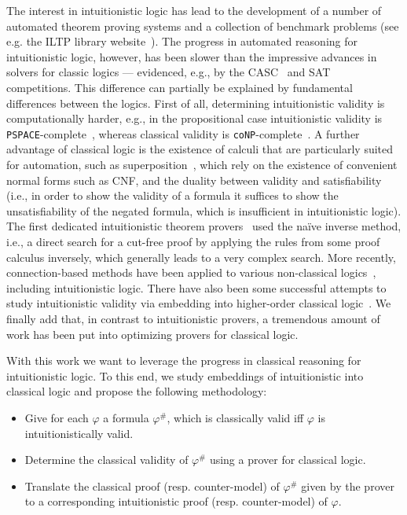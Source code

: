 \documentclass{easychair}
\theoremstyle{definition}
\theoremstyle{definition}
\theoremstyle{definition}
\theoremstyle{definition}
\theoremstyle{definition}
\theoremstyle{definition}
\theoremstyle{definition}
\begin{document}
The interest in intuitionistic logic has lead to the development of a number of automated theorem proving systems and a collection of benchmark problems (see e.g. the ILTP library website~\cite{iltp}).
The progress in automated reasoning for intuitionistic logic, however, has been slower than the  impressive advances in solvers for classic logics --- evidenced, e.g., by the CASC~\cite{casc} and SAT~\cite{satc} competitions.
This difference can partially be explained by fundamental differences between the logics.
First of all, determining intuitionistic validity is computationally harder, e.g., in the propositional case intuitionistic validity is \verb+PSPACE+-complete~\cite{statman1979intuitionistic}, whereas classical validity is \verb+coNP+-complete~\cite{cook1971complexity}.
A further advantage of classical logic is the existence of calculi that are particularly suited for automation, such as superposition~\cite{bachmair2001resolution}, which rely on the existence of convenient normal forms such as CNF, and the duality between validity and satisfiability (i.e., in order to show the validity of a formula it suffices to show the unsatisfiability of the negated formula, which is insufficient in intuitionistic logic).
The first dedicated intuitionistic theorem provers~\cite{mclaughlin2009efficient,tammet1996resolution} used the naïve inverse method, i.e., a direct search for a cut-free proof by applying the rules from some proof calculus inversely, which generally leads to a very complex search.
More recently, connection-based methods have been applied to various non-classical logics~\cite{otten2005clausal,otten2021nanocop}, including intuitionistic logic.
There have also been some successful attempts to study intuitionistic validity via embedding into higher-order classical logic~\cite{LEO}.
We finally add that, in contrast to intuitionistic provers, a tremendous amount of work has been put into optimizing provers for classical logic.

With this work we want to leverage the progress in classical reasoning for intuitionistic logic.
To this end, we study embeddings of intuitionistic into classical logic and propose the following methodology:
\begin{itemize}\addtolength{\itemsep}{-5pt}
	\item Give for each $\varphi$ a formula $\varphi^\#$, which is classically valid iff $\varphi$ is intuitionistically valid.
	\item Determine the classical validity of $\varphi^\#$ using a prover for classical logic.
	\item Translate the classical proof (resp. counter-model) of $\varphi^\#$ given by the prover to a corresponding intuitionistic proof (resp. counter-model) of $\varphi$.
\end{itemize}
\end{document}
